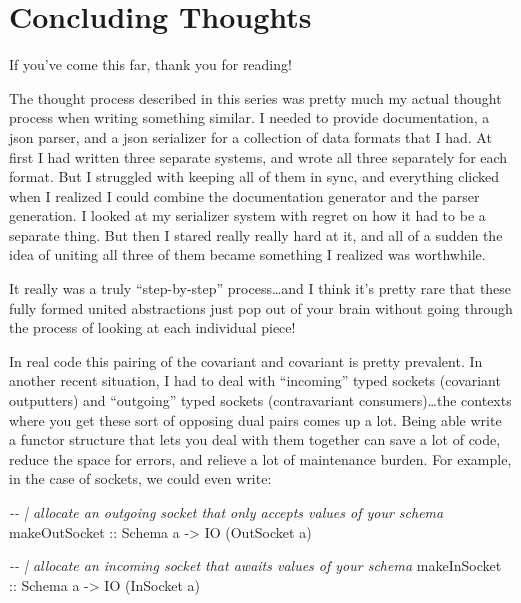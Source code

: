 \documentclass[]{article}
\newenvironment{Shaded}{}{}
\newcommand{\CommentTok}[1]{\textcolor[rgb]{0.38,0.63,0.69}{\textit{#1}}}
\newcommand{\DataTypeTok}[1]{\textcolor[rgb]{0.56,0.13,0.00}{#1}}
\newcommand{\NormalTok}[1]{#1}
\newcommand{\OtherTok}[1]{\textcolor[rgb]{0.00,0.44,0.13}{#1}}
\begin{document}
\hypertarget{concluding-thoughts}{%
\section{Concluding Thoughts}\label{concluding-thoughts}}

If you've come this far, thank you for reading!

The thought process described in this series was pretty much my actual thought
process when writing something similar. I needed to provide documentation, a
json parser, and a json serializer for a collection of data formats that I had.
At first I had written three separate systems, and wrote all three separately
for each format. But I struggled with keeping all of them in sync, and
everything clicked when I realized I could combine the documentation generator
and the parser generation. I looked at my serializer system with regret on how
it had to be a separate thing. But then I stared really really hard at it, and
all of a sudden the idea of uniting all three of them became something I
realized was worthwhile.

It really was a truly ``step-by-step'' process\ldots and I think it's pretty
rare that these fully formed united abstractions just pop out of your brain
without going through the process of looking at each individual piece!

In real code this pairing of the covariant and covariant is pretty prevalent. In
another recent situation, I had to deal with ``incoming'' typed sockets
(covariant outputters) and ``outgoing'' typed sockets (contravariant
consumers)\ldots the contexts where you get these sort of opposing dual pairs
comes up a lot. Being able write a functor structure that lets you deal with
them together can save a lot of code, reduce the space for errors, and relieve a
lot of maintenance burden. For example, in the case of sockets, we could even
write:

\begin{Shaded}
\begin{Highlighting}[]
\CommentTok{{-}{-} | allocate an outgoing socket that only accepts values of your schema}
\OtherTok{makeOutSocket ::} \DataTypeTok{Schema}\NormalTok{ a }\OtherTok{{-}>} \DataTypeTok{IO}\NormalTok{ (}\DataTypeTok{OutSocket}\NormalTok{ a)}

\CommentTok{{-}{-} | allocate an incoming socket that awaits values of your schema}
\OtherTok{makeInSocket ::} \DataTypeTok{Schema}\NormalTok{ a }\OtherTok{{-}>} \DataTypeTok{IO}\NormalTok{ (}\DataTypeTok{InSocket}\NormalTok{ a)}
\end{Highlighting}
\end{Shaded}
\end{document}
